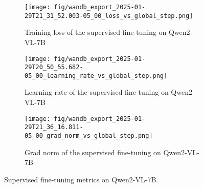 \begin{figure*}[ht]
    \centering
    \begin{subfigure}[b]{0.3\textwidth}
        \centering
        \texttt{[image: fig/wandb\_export\_2025-01-29T21\_31\_52.003-05\_00\_loss\_vs\_global\_step.png]}
        \caption{Training loss of the supervised fine-tuning on Qwen2-VL-7B}
        \label{fig:sub1_1}
    \end{subfigure}
    \begin{subfigure}[b]{0.3\textwidth}
        \centering
        \texttt{[image: fig/wandb\_export\_2025-01-29T20\_50\_55.682-05\_00\_learning\_rate\_vs\_global\_step.png]}
        \caption{Learning rate of the supervised fine-tuning on Qwen2-VL-7B}
        \label{fig:sub1_2}
    \end{subfigure}
    \begin{subfigure}[b]{0.3\textwidth}
        \centering
        \texttt{[image: fig/wandb\_export\_2025-01-29T21\_36\_16.811-05\_00\_grad\_norm\_vs\_global\_step.png]}
        \caption{Grad norm of the supervised fine-tuning on Qwen2-VL-7B}
        \label{fig:sub2_1}
    \end{subfigure}
    
    \caption{Supervised fine-tuning metrics on Qwen2-VL-7B. 
    }
    \label{fig:training_process}
    \vspace{-0.1in}
\end{figure*}
